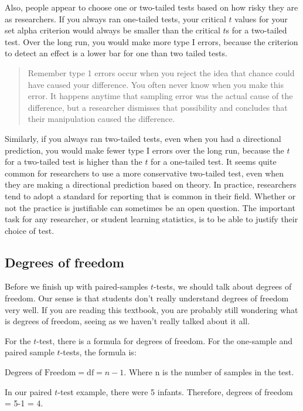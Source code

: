\documentclass[
  letterpaper,
  DIV=11,
  numbers=noendperiod]{scrreprt}
\begin{document}
Also, people appear to choose one or two-tailed tests based on how risky
they are as researchers. If you always ran one-tailed tests, your
critical \(t\) values for your set alpha criterion would always be
smaller than the critical \(t\)s for a two-tailed test. Over the long
run, you would make more type I errors, because the criterion to detect
an effect is a lower bar for one than two tailed tests.

\begin{quote}
Remember type 1 errors occur when you reject the idea that chance could
have caused your difference. You often never know when you make this
error. It happens anytime that sampling error was the actual cause of
the difference, but a researcher dismisses that possibility and
concludes that their manipulation caused the difference.
\end{quote}

Similarly, if you always ran two-tailed tests, even when you had a
directional prediction, you would make fewer type I errors over the long
run, because the \(t\) for a two-tailed test is higher than the \(t\)
for a one-tailed test. It seems quite common for researchers to use a
more conservative two-tailed test, even when they are making a
directional prediction based on theory. In practice, researchers tend to
adopt a standard for reporting that is common in their field. Whether or
not the practice is justifiable can sometimes be an open question. The
important task for any researcher, or student learning statistics, is to
be able to justify their choice of test.

\subsection{Degrees of freedom}\label{degrees-of-freedom}

Before we finish up with paired-samples \(t\)-tests, we should talk
about degrees of freedom. Our sense is that students don't really
understand degrees of freedom very well. If you are reading this
textbook, you are probably still wondering what is degrees of freedom,
seeing as we haven't really talked about it all.

For the \(t\)-test, there is a formula for degrees of freedom. For the
one-sample and paired sample \(t\)-tests, the formula is:

\(\text{Degrees of Freedom} = \text{df} = n-1\). Where n is the number
of samples in the test.

In our paired \(t\)-test example, there were 5 infants. Therefore,
degrees of freedom = 5-1 = 4.
\end{document}
